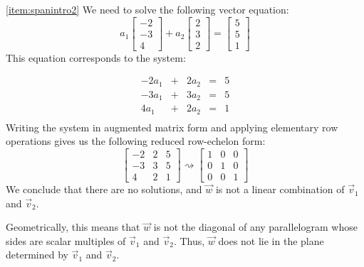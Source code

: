 \documentclass{ximera}
\begin{document}
\begin{example}
\begin{explanation}
  
  
  
\ref{item:spanintro2}  
We need to solve the following vector equation:   $$a_1\begin{bmatrix}-2\\-3\\4\end{bmatrix}+a_2\begin{bmatrix}2\\3\\2\end{bmatrix}=\begin{bmatrix}5\\5\\1\end{bmatrix}$$
  This equation corresponds to the system:
  
  $$\begin{array}{ccccc}
      -2a_1 & +&2a_2&= &5 \\
        -3a_1& +&3a_2&= &5 \\
      4a_1 &+ &2a_2&= &1\\
	     \end{array}$$
  Writing the system in augmented matrix form and applying elementary row operations gives us the following reduced row-echelon form:
  $$\left[\begin{array}{cc|c}  
 -2&2&5\\-3&3&5\\4&2&1
 \end{array}\right]\rightsquigarrow\left[\begin{array}{cc|c}  
 1&0&0\\0&1&0\\0&0&1
 \end{array}\right]$$
 We conclude that there are no solutions, and $\vec{w}$ is not a linear combination of $\vec{v}_1$ and $\vec{v}_2$.
 
 Geometrically, this means that $\vec{w}$ is not the diagonal of any parallelogram whose sides are scalar multiples of $\vec{v}_1$ and $\vec{v}_2$.  Thus, $\vec{w}$ does not lie in the plane determined by $\vec{v}_1$ and $\vec{v}_2$.  
 
  \begin{image}
\end{image}
\end{explanation}
\end{example}
\end{document}
